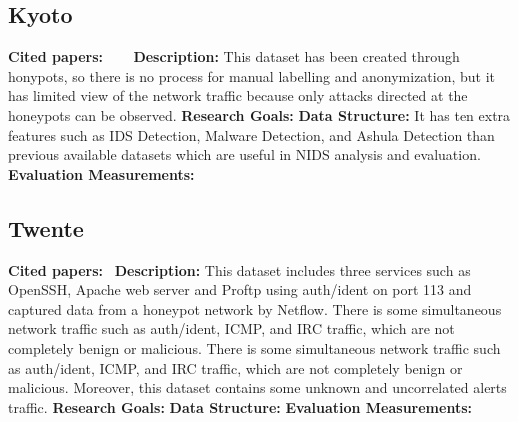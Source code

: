 \subsection{Kyoto}
\textbf{Cited papers:} ~\cite{song2011statistical}~\cite{sato2012unknown}~\cite{chitrakar2012anomaly}\newline
\textbf{Description:} This dataset has been created through honypots, so there is no process for manual labelling and anonymization, but it has limited view of the network traffic because only attacks directed at the honeypots can be observed.\newline
\textbf{Research Goals:}  \newline
\textbf{Data Structure:} It has ten extra features such as IDS Detection, Malware Detection, and Ashula Detection than previous available datasets which are useful in NIDS analysis and evaluation. \newline
\textbf{Evaluation Measurements:} \newline











\subsection{Twente}
\textbf{Cited papers:}~\cite{sperotto2009labeled} \newline
\textbf{Description:} This dataset includes three services such as OpenSSH, Apache web server and Proftp using auth/ident on port 113 and captured data from a honeypot network by Netflow. There is some simultaneous network traffic such as auth/ident, ICMP, and IRC traffic, which are not completely benign or malicious. There is some simultaneous network traffic such as auth/ident, ICMP, and IRC traffic, which are not completely benign or malicious. Moreover, this dataset contains some unknown and uncorrelated alerts traffic.\newline
\textbf{Research Goals:}  \newline
\textbf{Data Structure:} \newline
\textbf{Evaluation Measurements:} \newline






